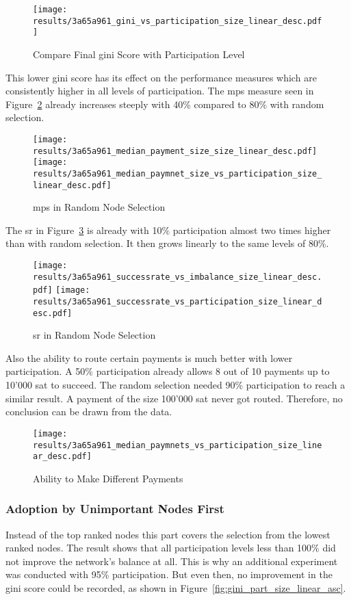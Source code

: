 \documentclass[final]{fhnwreport}       %
\begin{document}
\begin{figure}[H]
\centering
\texttt{[image: results/3a65a961\_gini\_vs\_participation\_size\_linear\_desc.pdf]}
\caption{Compare Final \gls{gini} Score with Participation Level}
\label{fig:gini_part_size_linear_desc}
\end{figure}

This lower \gls{gini} score has its effect on the performance measures which are consistently higher in all levels of participation. The \gls{mps} measure seen in Figure~\ref{fig:pay_size_size_linear_desc} already increases steeply with 40\% compared to 80\% with random selection.

\begin{figure}[htp]
\centering
\texttt{[image: results/3a65a961\_median\_payment\_size\_size\_linear\_desc.pdf]}\hfill
\texttt{[image: results/3a65a961\_median\_paymnet\_size\_vs\_participation\_size\_linear\_desc.pdf]}
\caption{\gls{mps} in Random Node Selection}
\label{fig:pay_size_size_linear_desc}
\end{figure}


The \gls{sr} in Figure~\ref{fig:success_size_linear_desc} is already with 10\% participation almost two times higher than with random selection. It then grows linearly to the same levels of 80\%.

\begin{figure}[htp]
\centering
\texttt{[image: results/3a65a961\_successrate\_vs\_imbalance\_size\_linear\_desc.pdf]}\hfill
\texttt{[image: results/3a65a961\_successrate\_vs\_participation\_size\_linear\_desc.pdf]}
\caption{\gls{sr} in Random Node Selection}
\label{fig:success_size_linear_desc}
\end{figure}

Also the ability to route certain payments is much better with lower participation. A 50\% participation already allows 8 out of 10 payments up to 10'000 sat to succeed. The random selection needed 90\% participation to reach a similar result. A payment of the size 100'000 sat never got routed. Therefore, no conclusion can be drawn from the data.

\begin{figure}[htp]
\centering
\texttt{[image: results/3a65a961\_median\_paymnets\_vs\_participation\_size\_linear\_desc.pdf]}
\caption{Ability to Make Different Payments}
\label{fig:sizes_size_linear_desc}
\end{figure}


\subsubsection{Adoption by Unimportant Nodes First}\label{subsub:asc}
Instead of the top ranked nodes this part covers the selection from the lowest ranked nodes. The result shows that all participation levels less than 100\% did not improve the network's balance at all. This is why an additional experiment was conducted with 95\% participation. But even then, no improvement in the \gls{gini} score could be recorded, as shown in Figure~\ref{fig:gini_part_size_linear_asc}.
\end{document}
